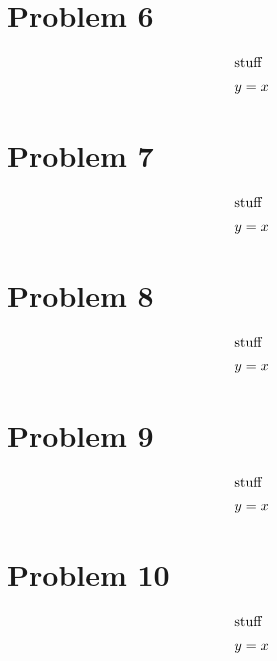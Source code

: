 \documentclass[12pt]{article}
\begin{document}
\section*{Problem 6}

\begin{align} 
    \intertext{stuff}
    y&=x
\end{align}



\section*{Problem 7}

\begin{align} 
    \intertext{stuff}
    y&=x
\end{align}


\section*{Problem 8}

\begin{align} 
    \intertext{stuff}
    y&=x
\end{align}



\section*{Problem 9}

\begin{align} 
    \intertext{stuff}
    y&=x
\end{align}


\section*{Problem 10}

\begin{align} 
    \intertext{stuff}
    y&=x
\end{align}
\end{document}
